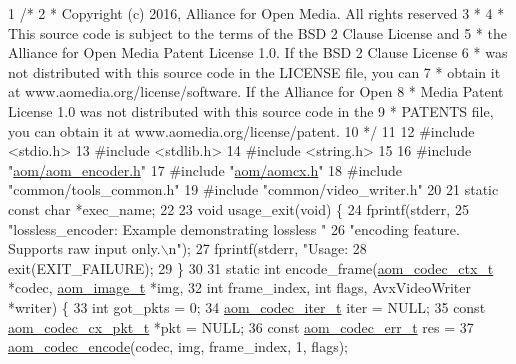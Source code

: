 \begin{DoxyCodeInclude}
1 \textcolor{comment}{/*}
2 \textcolor{comment}{ * Copyright (c) 2016, Alliance for Open Media. All rights reserved}
3 \textcolor{comment}{ *}
4 \textcolor{comment}{ * This source code is subject to the terms of the BSD 2 Clause License and}
5 \textcolor{comment}{ * the Alliance for Open Media Patent License 1.0. If the BSD 2 Clause License}
6 \textcolor{comment}{ * was not distributed with this source code in the LICENSE file, you can}
7 \textcolor{comment}{ * obtain it at www.aomedia.org/license/software. If the Alliance for Open}
8 \textcolor{comment}{ * Media Patent License 1.0 was not distributed with this source code in the}
9 \textcolor{comment}{ * PATENTS file, you can obtain it at www.aomedia.org/license/patent.}
10 \textcolor{comment}{ */}
11 
12 \textcolor{preprocessor}{#include <stdio.h>}
13 \textcolor{preprocessor}{#include <stdlib.h>}
14 \textcolor{preprocessor}{#include <string.h>}
15 
16 \textcolor{preprocessor}{#include "\hyperlink{aom__encoder_8h}{aom/aom\_encoder.h}"}
17 \textcolor{preprocessor}{#include "\hyperlink{aomcx_8h}{aom/aomcx.h}"}
18 \textcolor{preprocessor}{#include "common/tools\_common.h"}
19 \textcolor{preprocessor}{#include "common/video\_writer.h"}
20 
21 \textcolor{keyword}{static} \textcolor{keyword}{const} \textcolor{keywordtype}{char} *exec\_name;
22 
23 \textcolor{keywordtype}{void} usage\_exit(\textcolor{keywordtype}{void}) \{
24   fprintf(stderr,
25           \textcolor{stringliteral}{"lossless\_encoder: Example demonstrating lossless "}
26           \textcolor{stringliteral}{"encoding feature. Supports raw input only.\(\backslash\)n"});
27   fprintf(stderr, \textcolor{stringliteral}{"Usage: %
28   exit(EXIT\_FAILURE);
29 \}
30 
31 \textcolor{keyword}{static} \textcolor{keywordtype}{int} encode\_frame(\hyperlink{structaom__codec__ctx}{aom\_codec\_ctx\_t} *codec, \hyperlink{structaom__image}{aom\_image\_t} *img,
32                         \textcolor{keywordtype}{int} frame\_index, \textcolor{keywordtype}{int} flags, AvxVideoWriter *writer) \{
33   \textcolor{keywordtype}{int} got\_pkts = 0;
34   \hyperlink{group__codec_gadf9e173c9e02788a9999399edab20a02}{aom\_codec\_iter\_t} iter = NULL;
35   \textcolor{keyword}{const} \hyperlink{structaom__codec__cx__pkt}{aom\_codec\_cx\_pkt\_t} *pkt = NULL;
36   \textcolor{keyword}{const} \hyperlink{group__codec_gaaae61e0f8663e6137f1e228757248e7c}{aom\_codec\_err\_t} res =
37       \hyperlink{group__encoder_ga6f4a777de5389771e783df7ff1f116d4}{aom\_codec\_encode}(codec, img, frame\_index, 1, flags);
}
\end{DoxyCodeInclude}
